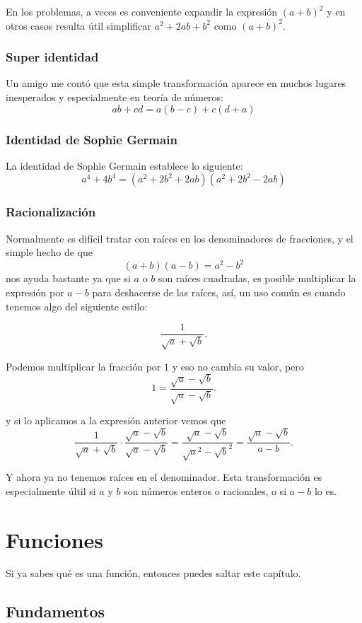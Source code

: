 En los problemas, a veces es conveniente
expandir la expresión $(a + b)^2$
y en otros casos resulta útil simplificar
$a^2 + 2ab + b^2$ como $(a + b)^2$.

\subsection{Super identidad}
Un amigo me contó que esta simple
transformación aparece en muchos lugares
inesperados y especialmente en teoría de números:
\[ab + cd = a(b - c) + c(d + a)\]

\subsection{Identidad de Sophie Germain}
La identidad de Sophie Germain establece lo siguiente:
\[a^4 + 4b^4 = (a^2 + 2b^2 + 2ab)(a^2 + 2b^2 - 2ab)\]

\subsection{Racionalización}
Normalmente es difícil tratar con raíces en
los denominadores de fracciones,
y el simple hecho de que
\[(a + b)(a - b) = a^2 - b^2\]
nos ayuda bastante ya que si
$a$ o $b$ son raíces cuadradas, es posible
multiplicar la expresión por $a - b$
para deshacerse de las raíces,
así, un uso común es cuando tenemos algo del
siguiente estilo:

\[\frac1{\sqrt a + \sqrt b}.\]

Podemos multiplicar la fracción
por $1$ y eso no cambia su valor,
pero
\[1 = \frac{\sqrt a - \sqrt b}{\sqrt a - \sqrt b}.\]

y si lo aplicamos a la expresión anterior vemos que
\[\frac1{\sqrt a + \sqrt b}\cdot\frac{\sqrt a - \sqrt b}{\sqrt a - \sqrt b} = \frac{\sqrt a - \sqrt b}{\sqrt a ^2 - \sqrt b ^2} = \frac{\sqrt a - \sqrt b}{a - b}.\]

Y ahora ya no tenemos raíces en el denominador.
Esta transformación es especialmente
últil si $a$ y $b$ son números
enteros o racionales, o
si $a - b$ lo es.

\chapter{Funciones}
Si ya sabes qué es una función,
entonces puedes saltar este capítulo.

\section{Fundamentos}

